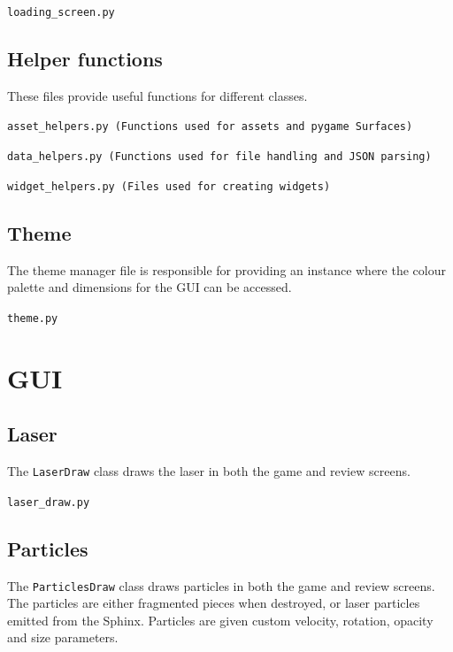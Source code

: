 \documentclass[../main/main.tex]{subfiles}
\begin{document}
\noindent\verb|loading_screen.py|


\subsection{Helper functions}
These files provide useful functions for different classes.

\label{sec:asset-helpers}
\noindent\verb|asset_helpers.py (Functions used for assets and pygame Surfaces)|


\bigskip
\label{sec:data-helpers}
\noindent\verb|data_helpers.py (Functions used for file handling and JSON parsing)|


\bigskip
\noindent\verb|widget_helpers.py (Files used for creating widgets)|


\subsection{Theme}
\label{sec:theme}
The theme manager file is responsible for providing an instance where the colour palette and dimensions for the GUI can be accessed.

\noindent\verb|theme.py|


\section{GUI}
\subsection{Laser}
The \lstinline{LaserDraw} class draws the laser in both the game and review screens.

\noindent\verb|laser_draw.py|


\subsection{Particles}
The \lstinline{ParticlesDraw} class draws particles in both the game and review screens. The particles are either fragmented pieces when destroyed, or laser particles emitted from the Sphinx. Particles are given custom velocity, rotation, opacity and size parameters.
\end{document}
